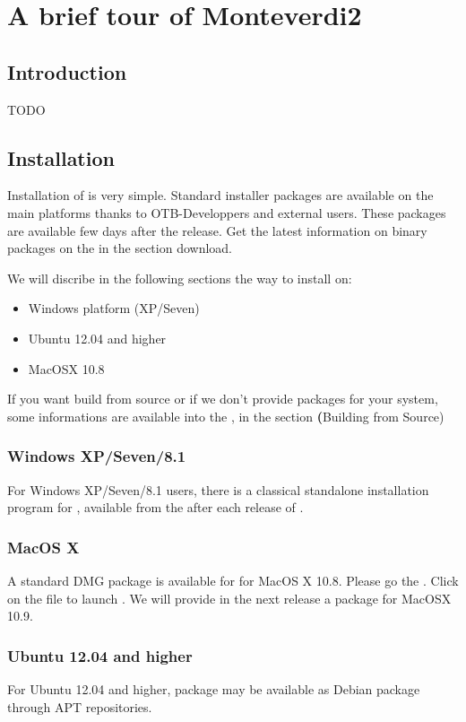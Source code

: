 \chapter{A brief tour of Monteverdi2}\label{chap:Monteverdi2} 

\section{Introduction}\label{sec:montintro}
TODO 

\section{Installation}\label{sec:montinstall} 
  
Installation of \montNew is very simple. Standard installer packages are available on the main platforms thanks to OTB-Developpers and external users. These packages are available few days after the release. Get the latest information on binary packages on the \website in the section download.

We will discribe in the following sections the way to install \montNew on:
\begin{itemize}
\item Windows platform (XP/Seven)
\item Ubuntu 12.04 and higher
\item MacOSX 10.8
\end{itemize}

If you want build from source or if we don't provide packages for your system, some informations are available into the \sg, in the section \textbf(Building from Source)

\subsection{Windows XP/Seven/8.1}
For Windows XP/Seven/8.1 users, there is a classical standalone installation program for \montNew, available from the \download after each release of \montNew. 

\subsection{MacOS X}
A standard DMG package is available for \montNew for MacOS X 10.8. Please go the \download.
Click on the file to launch \montNew. We will provide in the next release a package for MacOSX 10.9.

\subsection{Ubuntu 12.04 and higher}
For Ubuntu 12.04 and higher, \montNew package may be available as Debian package through APT repositories.

